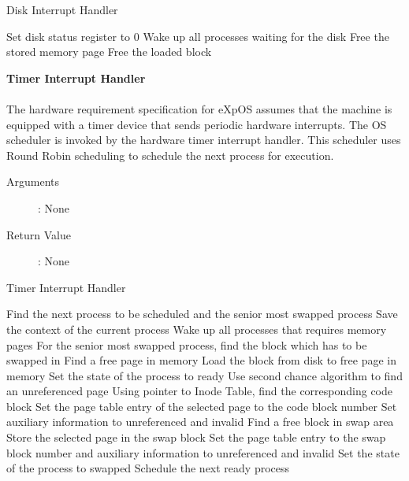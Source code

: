 \documentclass[10pt]{article}
\begin{document}
\begin{algorithm}
\caption{Disk Interrupt Handler}
\begin{algorithmic}
\STATE Set disk status register to 0
    \STATE Wake up all processes waiting for the disk
\ENDIF
{}
        \STATE Free the stored memory page
    \ELSE
            \STATE Free the loaded block
        \ENDIF
    \ENDIF
\ENDIF
\RETURN
\end{algorithmic}
\end{algorithm}
\textbf{Timer Interrupt Handler}
\\ \\
 The hardware requirement specification for eXpOS assumes that the machine is equipped with a timer device that sends periodic hardware interrupts. The OS scheduler is invoked by the hardware timer interrupt handler. This scheduler uses Round Robin scheduling to schedule the next process for execution. 
\begin{description}
\item[Arguments]: None
\item[Return Value]: None
\end{description} 
\begin{algorithm}
\caption{Timer Interrupt Handler}
\begin{algorithmic}
\STATE Find the next process to be scheduled and the senior most swapped process
\STATE Save the context of the current process
        \STATE Wake up all processes that requires memory pages
    \ELSE
            \STATE For the senior most swapped process, find the block which has to be swapped in
            \STATE Find a free page in memory
            \STATE Load the block from disk to free page in memory
            \STATE Set the state of the process to ready
        \ENDIF
    \ENDIF
\ELSE
        \STATE Use second chance algorithm to find an unreferenced page
            \STATE Using pointer to Inode Table, find the corresponding code block
            \STATE Set the page table entry of the selected page to the code block number
            \STATE Set auxiliary information to unreferenced and invalid
        \ENDIF
            \STATE Find a free block in swap area
            \STATE Store the selected page in the swap block
            \STATE Set the page table entry to the swap block number and auxiliary information to unreferenced and invalid
                \STATE Set the state of the process to swapped
            \ENDIF
        \ENDIF
    \ENDIF
\ENDIF
\STATE Schedule the next ready process
\RETURN
\end{algorithmic}
\end{algorithm}
\vspace{30mm}
\end{document}
